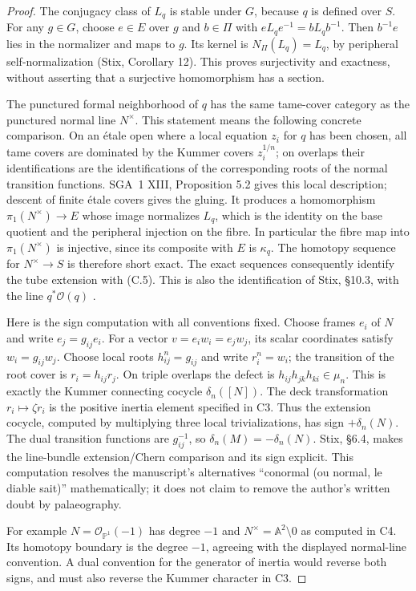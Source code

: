\begin{proof}
The conjugacy class of $L_q$ is stable under $G$, because $q$ is defined
over $S$. For any $g\in G$, choose $e\in E$ over $g$ and $b\in\Pi$
with $eL_qe^{-1}=bL_qb^{-1}$. Then $b^{-1}e$ lies in the normalizer
and maps to $g$. Its kernel is $N_\Pi(L_q)=L_q$, by peripheral
self-normalization (Stix, Corollary 12). This proves surjectivity and
exactness, without asserting that a surjective homomorphism has a section.

The punctured formal neighborhood of $q$ has the same tame-cover
category as the punctured normal line $N^\times$. This statement means
the following concrete comparison. On an \'etale open where a local
equation $z_i$ for $q$ has been chosen, all tame covers are dominated by
the Kummer covers $z_i^{1/n}$; on overlaps their identifications are the
identifications of the corresponding roots of the normal transition
functions. SGA~1 XIII, Proposition 5.2 gives this local description;
descent of finite \'etale covers gives the gluing. It produces a
homomorphism $\pi_1(N^\times)\to E$ whose image normalizes $L_q$,
which is the identity on the base quotient and the peripheral injection
on the fibre. In particular the fibre map into $\pi_1(N^\times)$ is injective, since its composite with $E$ is $\kappa_q$. The homotopy sequence for $N^\times\to S$ is therefore short exact. The exact sequences consequently identify the tube
extension with (C.5). This is also the identification of Stix,
\S10.3, with the line $q^*\mathcal O(q)$ \cite{CF_Stix2008}.

Here is the sign computation with all conventions fixed. Choose frames
$e_i$ of $N$ and write $e_j=g_{ij}e_i$. For a vector
$v=e_iw_i=e_jw_j$, its scalar coordinates satisfy $w_i=g_{ij}w_j$.
Choose local roots $h_{ij}^n=g_{ij}$ and write $r_i^n=w_i$;
the transition of the root cover is $r_i=h_{ij}r_j$. On triple overlaps
the defect is $h_{ij}h_{jk}h_{ki}\in\mu_n$. This is exactly the
Kummer connecting cocycle $\delta_n([N])$. The deck transformation
$r_i\mapsto\zeta r_i$ is the positive inertia element specified in C3.
Thus the extension cocycle, computed by multiplying three local
trivializations, has sign $+\delta_n(N)$. The dual transition
functions are $g_{ij}^{-1}$, so $\delta_n(M)=-\delta_n(N)$.
Stix, \S6.4, makes the line-bundle extension/Chern comparison and its
sign explicit. This computation resolves the manuscript's alternatives
``conormal (ou normal, le diable sait)'' mathematically; it does not
claim to remove the author's written doubt by palaeography.

For example $N=\mathcal O_{\mathbb P^1}(-1)$ has degree $-1$ and
$N^\times=\mathbb A^2\setminus0$ as computed in C4. Its homotopy
boundary is the degree $-1$, agreeing with the displayed normal-line
convention. A dual convention for the generator of inertia would
reverse both signs, and must also reverse the Kummer character in C3.
\end{proof}

